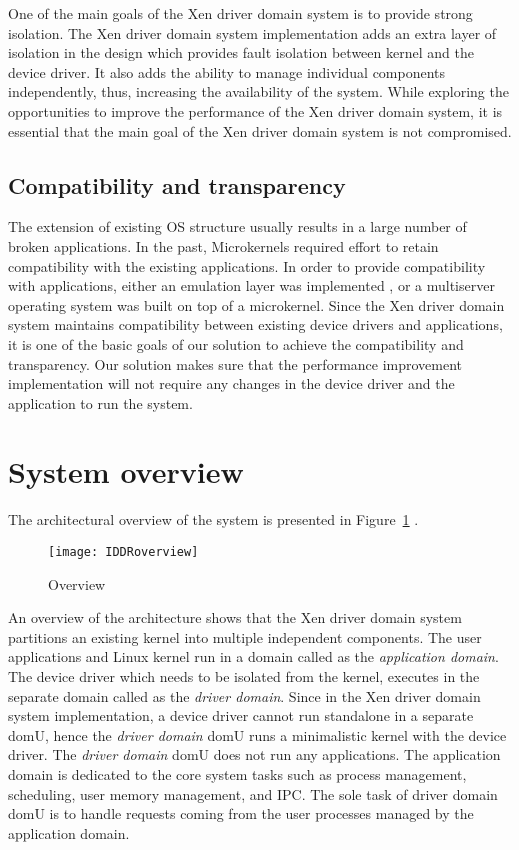 One of the main goals of the Xen driver domain system is to provide strong isolation. The Xen driver domain system implementation adds an extra layer of isolation in the design which provides fault isolation between kernel and the device driver. It also adds the ability to manage individual components independently, thus, increasing the availability of the system. While exploring the opportunities to improve the performance of the Xen driver domain system, it is essential that the main goal of the Xen driver domain system is not compromised.

\subsection{Compatibility and transparency} 
\label{subsec:compatibility}
The extension of existing OS structure usually results in a large number of broken applications. In the past, Microkernels required effort to retain compatibility with the existing applications\cite{Heiser06arevirtualmachine}. In order to provide compatibility with applications, either an emulation layer was implemented \cite{Heiser06arevirtualmachine}, or a multiserver operating system \cite{Gefflaut00thesawmill,Tanenbaum06canwe} was built on top of a microkernel. Since the Xen driver domain system maintains compatibility between existing device drivers and applications, it is one of the basic goals of our solution to achieve the compatibility and transparency. Our solution makes sure that the performance improvement implementation will not require any changes in the device driver and the application to run the system.

\pagebreak

\section{System overview}\label{overview}
The architectural overview of the system is presented in Figure~\ref{fig:overview} .
\begin{figure}[!ht]
\centering
\texttt{[image: IDDRoverview]}
\caption{Overview}
\label{fig:overview}
\end{figure}
An overview of the architecture shows that the Xen driver domain system partitions an existing kernel into multiple independent components. The user applications and Linux kernel run in a domain called as the \textit{application domain}. The device driver which needs to be isolated from the kernel, executes in the separate domain called as the \textit{driver domain}. Since in the Xen driver domain system implementation, a device driver cannot run standalone in a separate domU, hence the \textit{driver domain} domU runs a minimalistic kernel with the device driver. The \textit{driver domain} domU does not run any applications. The application domain is dedicated to the core system tasks such as process management, scheduling, user memory management, and IPC. The sole task of driver domain domU is to handle requests coming from the user processes managed by the application domain.
\pagebreak

